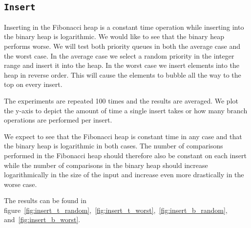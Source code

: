 \documentclass[a4paper,oneside,article,11pt]{memoir}
\begin{document}
\subsection{\texttt{Insert}}
Inserting in the Fibonacci heap is a constant time operation while inserting into the binary heap is logarithmic. We would like to see that the binary heap performs worse. We will test both priority queues in both the average case and the worst case. In the average case we select a random priority in the integer range and insert it into the heap.
In the worst case we insert elements into the heap in reverse order. This will cause the elements to bubble all the way to the top on every insert.

The experiments are repeated 100 times and the results are averaged. We plot the y-axis to depict the amount of time a single insert takes or how many branch operations are performed per insert.

We expect to see that the Fibonacci heap is constant time in any case and that the binary heap is logarithmic in both cases. The number of comparisons performed in the Fibonacci heap should therefore also be constant on each insert while the number of comparisons in the binary heap should increase logarithmically in the size of the input and increase even more drastically in the worse case.

The results can be found in figure~\ref{fig:insert_t_random},~\ref{fig:insert_t_worst},~\ref{fig:insert_b_random}, and~\ref{fig:insert_b_worst}.
\end{document}
